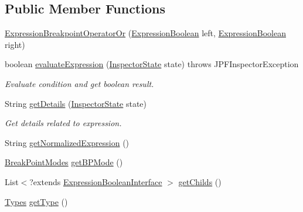 \subsection*{Public Member Functions}
\begin{DoxyCompactItemize}
\item 
\hyperlink{classgov_1_1nasa_1_1jpf_1_1inspector_1_1server_1_1expression_1_1expressions_1_1_expression_breakpoint_operator_or_a18f03073383ca1549de29da74c25eaff}{Expression\+Breakpoint\+Operator\+Or} (\hyperlink{classgov_1_1nasa_1_1jpf_1_1inspector_1_1server_1_1expression_1_1_expression_boolean}{Expression\+Boolean} left, \hyperlink{classgov_1_1nasa_1_1jpf_1_1inspector_1_1server_1_1expression_1_1_expression_boolean}{Expression\+Boolean} right)
\item 
boolean \hyperlink{classgov_1_1nasa_1_1jpf_1_1inspector_1_1server_1_1expression_1_1expressions_1_1_expression_breakpoint_operator_or_ae03708a0e0daba250c554d99c68b06f1}{evaluate\+Expression} (\hyperlink{interfacegov_1_1nasa_1_1jpf_1_1inspector_1_1server_1_1expression_1_1_inspector_state}{Inspector\+State} state)  throws J\+P\+F\+Inspector\+Exception 
\begin{DoxyCompactList}\small\item\em Evaluate condition and get boolean result. \end{DoxyCompactList}\item 
String \hyperlink{classgov_1_1nasa_1_1jpf_1_1inspector_1_1server_1_1expression_1_1expressions_1_1_expression_breakpoint_operator_or_a9ecb261295d5c3d5e3fd26cca2d129b0}{get\+Details} (\hyperlink{interfacegov_1_1nasa_1_1jpf_1_1inspector_1_1server_1_1expression_1_1_inspector_state}{Inspector\+State} state)
\begin{DoxyCompactList}\small\item\em Get details related to expression. \end{DoxyCompactList}\item 
String \hyperlink{classgov_1_1nasa_1_1jpf_1_1inspector_1_1server_1_1expression_1_1expressions_1_1_expression_breakpoint_operator_or_a25ea8f926923d598d21447b347d03912}{get\+Normalized\+Expression} ()
\item 
\hyperlink{enumgov_1_1nasa_1_1jpf_1_1inspector_1_1server_1_1breakpoints_1_1_break_point_modes}{Break\+Point\+Modes} \hyperlink{classgov_1_1nasa_1_1jpf_1_1inspector_1_1server_1_1expression_1_1_expression_boolean_binary_operator_a7ef59a2108ddded0cc7094ae1e3086d7}{get\+B\+P\+Mode} ()
\item 
List$<$?extends \hyperlink{interfacegov_1_1nasa_1_1jpf_1_1inspector_1_1server_1_1expression_1_1_expression_boolean_interface}{Expression\+Boolean\+Interface} $>$ \hyperlink{classgov_1_1nasa_1_1jpf_1_1inspector_1_1server_1_1expression_1_1_expression_boolean_binary_operator_a8cf5fe32bcd0cd345799ea65905beac3}{get\+Childs} ()
\item 
\hyperlink{enumgov_1_1nasa_1_1jpf_1_1inspector_1_1server_1_1expression_1_1_types}{Types} \hyperlink{classgov_1_1nasa_1_1jpf_1_1inspector_1_1server_1_1expression_1_1_expression_boolean_aed010ff8683eb1e8621e226703133457}{get\+Type} ()
\end{DoxyCompactItemize}
